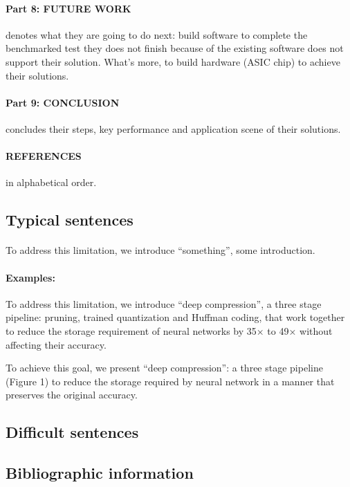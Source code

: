 \documentclass{article}
\begin{document}
\paragraph{Part 8: FUTURE WORK} denotes what they are going to do next: build software 
to complete the benchmarked test they does not finish because of the existing software 
does not support their solution. What's more, to build hardware (ASIC chip) to achieve 
their solutions.

\paragraph{Part 9: CONCLUSION} concludes their steps, key performance and application 
scene of their solutions.

\paragraph{REFERENCES} in alphabetical order.
\subsection{Typical sentences}
\paragraph{} To address this limitation, we introduce “something”, some introduction.

\paragraph{Examples:} To
address this limitation, we introduce “deep compression”, a three stage pipeline:
pruning, trained quantization and Huffman coding, that work together to reduce
the storage requirement of neural networks by 35× to 49× without affecting their
accuracy.

To achieve this goal, we present “deep compression”: a three stage pipeline (Figure 1) 
to reduce the storage required by neural network in a manner that preserves the 
original accuracy.

\subsection{Difficult sentences}
\paragraph{} 
\subsection{Bibliographic information}
\paragraph{} 
\end{document}
